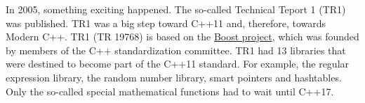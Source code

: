 

In 2005, something exciting happened. The so-called Technical Teport 1 (TR1) was published. TR1 was a big step toward C++11 and, therefore, towards Modern C++. TR1 (TR 19768) is based on the \href{https://www.boost.org/}{Boost project}, which was founded by members of the C++ standardization committee. TR1 had 13 libraries that were destined to become part of the C++11 standard. For example, the regular expression library, the random number library, smart pointers and hashtables. Only the so-called special mathematical functions had to wait until C++17.